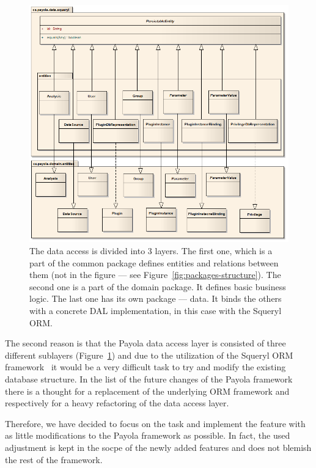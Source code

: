 \begin{figure}
	\centering
	\includegraphics[width=140mm]{img/data_entities.png}
	\caption{The data access is divided into 3 layers. The first one, which is a part of
	the common package defines entities and relations between them (not in the figure ---
	see Figure~\ref{fig:packages-structure}).
	The second one is a part of the domain package. It defines basic business logic.
	The last one has its own package --- data. It binds the others with a concrete DAL
	implementation, in this case with the Squeryl ORM. ~\cite{payola:dg}}
	\label{fig:3-layers}
\end{figure}

The second reason is that the Payola data access layer is consisted of three different sublayers
(Figure~\ref{fig:3-layers}) and 
due to the utilization of the Squeryl ORM framework~\cite{squeryl} it would be a very difficult 
task to try and modify the existing database structure. In the list of the future changes of 
the Payola framework there is a thought for a replacement of the underlying ORM framework
and respectively for a 
heavy refactoring of the data access layer.

Therefore, we have decided to focus on the task and implement the feature with 
as little modifications to the Payola framework as possible. In fact, the used adjustment is
kept in the socpe of the newly added features and does not blemish the rest of the framework.

